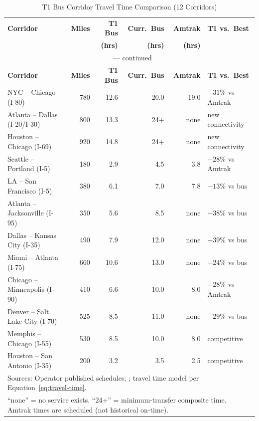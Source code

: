 \begin{longtable}{lrrrrl}
\caption{T1 Bus Corridor Travel Time Comparison (12 Corridors)}
\label{tab:corridors} \\
\toprule
\textbf{Corridor} & \textbf{Miles} & \textbf{T1 Bus} & \textbf{Curr.\ Bus} & \textbf{Amtrak} & \textbf{T1 vs.\ Best} \\
& & \textbf{(hrs)} & \textbf{(hrs)} & \textbf{(hrs)} & \\
\midrule
\endfirsthead
\multicolumn{6}{c}{\tablename\ \thetable{} --- continued} \\
\toprule
\textbf{Corridor} & \textbf{Miles} & \textbf{T1 Bus} & \textbf{Curr.\ Bus} & \textbf{Amtrak} & \textbf{T1 vs.\ Best} \\
\midrule
\endhead
\bottomrule
\endfoot
NYC -- Chicago (I-80)             & 780 & 12.6 & 20.0 & 19.0 & $-31\%$ vs Amtrak \\
Atlanta -- Dallas (I-20/I-30)     & 800 & 13.3 & 24+  & none & new connectivity \\
Houston -- Chicago (I-69)         & 920 & 14.8 & 24+  & none & new connectivity \\
Seattle -- Portland (I-5)         & 180 &  2.9 &  4.5 &  3.8 & $-28\%$ vs Amtrak \\
LA -- San Francisco (I-5)         & 380 &  6.1 &  7.0 &  7.8 & $-13\%$ vs bus    \\
Atlanta -- Jacksonville (I-95)    & 350 &  5.6 &  8.5 & none & $-38\%$ vs bus    \\
Dallas -- Kansas City (I-35)      & 490 &  7.9 & 12.0 & none & $-39\%$ vs bus    \\
Miami -- Atlanta (I-75)           & 660 & 10.6 & 13.0 & none & $-24\%$ vs bus    \\
Chicago -- Minneapolis (I-90)     & 410 &  6.6 & 10.0 &  8.0 & $-28\%$ vs Amtrak \\
Denver -- Salt Lake City (I-70)   & 525 &  8.5 & 11.0 & none & $-29\%$ vs bus    \\
Memphis -- Chicago (I-55)         & 530 &  8.5 & 10.0 &  8.0 & competitive       \\
Houston -- San Antonio (I-35)     & 200 &  3.2 &  3.5 &  2.5 & competitive       \\
\bottomrule
\multicolumn{6}{l}{\footnotesize Sources: Operator published schedules; \citet{Amtrak2023}; travel time model per Equation~\ref{eq:travel-time}.} \\
\multicolumn{6}{l}{\footnotesize ``none'' = no service exists. ``24+'' = minimum-transfer composite time. Amtrak times are scheduled (not historical on-time).}
\end{longtable}


